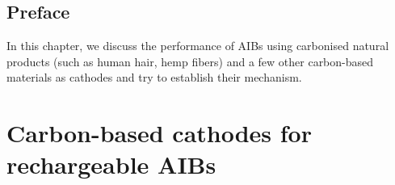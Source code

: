 \section*{Preface}
In this chapter, we discuss the performance of AIBs using carbonised natural products (such as human hair, hemp fibers) and a few other carbon-based materials as cathodes and try to establish their mechanism.
\pagebreak
\chapter{Carbon-based cathodes for rechargeable AIBs} %

\label{chap5} %


